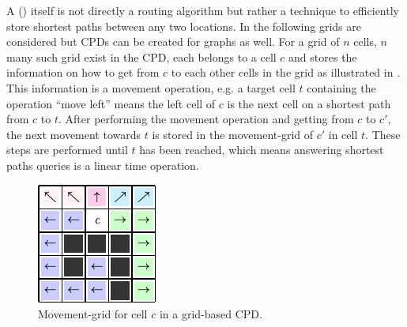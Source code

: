 			A  () itself is not directly a routing algorithm but rather a technique to efficiently store shortest paths between any two locations\cite{botea-cpd-2013}.
			In the following grids are considered but CPDs can be created for graphs as well.
			For a grid of $n$ cells, $n$ many such grid exist in the CPD, each belongs to a cell $c$ and stores the information on how to get from $c$ to each other cells in the grid as illustrated in .
			This information is a movement operation, e.g. a target cell $t$ containing the operation \enquote{move left} means the left cell of $c$ is the next cell on a shortest path from $c$ to $t$.
			After performing the movement operation and getting from $c$ to $c'$, the next movement towards $t$ is stored in the movement-grid of $c'$ in cell $t$.
			These steps are performed until $t$ has been reached, which means answering shortest paths queries is a linear time operation.
			
			\begin{figure}
				\vspace{-1.5\baselineskip}
				\includegraphics[width=\linewidth]{images/botea-cpd.pdf}
				\caption[Movement information in grid-based CPD.]{Movement-grid for cell $c$ in a grid-based CPD\cite{botea-cpd-2013}.}
				\label{fig:cpd}
			\end{figure}
			
